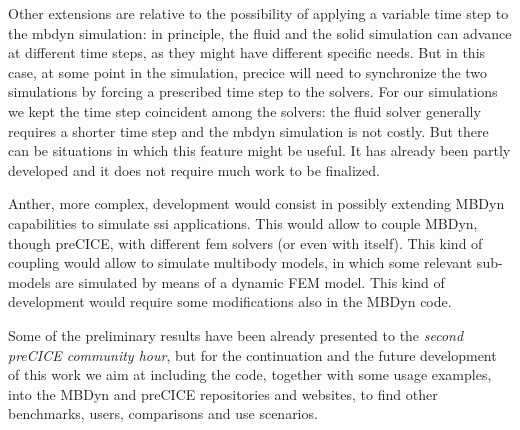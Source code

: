 Other extensions are relative to the possibility of applying a variable time step to the \acrshort{mbdyn} simulation: in principle, the fluid and the solid simulation can advance at different time steps, as they might have different specific needs. But in this case, at some point in the simulation, \acrshort{precice} will need to synchronize the two simulations by forcing a prescribed time step to the solvers. For our simulations we kept the time step coincident among the solvers: the fluid solver generally requires a shorter time step and the \acrshort{mbdyn} simulation is not costly. But there can be situations in which this feature might be useful. It has already been partly developed and it does not require much work to be finalized.

Anther, more complex, development would consist in possibly extending MBDyn capabilities to simulate \acrfull{ssi} applications. This would allow to couple MBDyn, though preCICE, with different \acrshort{fem} solvers (or even with itself). This kind of coupling would allow to simulate multibody models, in which some relevant sub-models are simulated by means of a dynamic FEM model. This kind of development would require some modifications also in the MBDyn code.

Some of the preliminary results have been already presented to the \textit{second preCICE community hour}, but for the continuation and the future development of this work we aim at including the code, together with some usage examples, into the MBDyn and preCICE repositories and websites, to find other benchmarks, users, comparisons and use scenarios.


